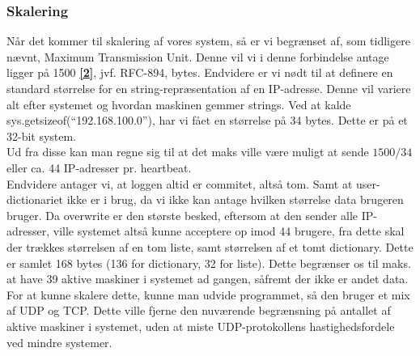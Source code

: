 \documentclass[a4paper,12pt]{article}
\begin{document}
\subsubsection{Skalering}
Når det kommer til skalering af vores system, så er vi begrænset af, som tidligere nævnt, Maximum Transmission Unit. Denne vil vi i denne forbindelse antage ligger på 1500 \hyperref[to]{\textbf{[2]}}, jvf. RFC-894, bytes. Endvidere er vi nødt til at definere en standard størrelse for en string-repræsentation af en IP-adresse. Denne vil variere alt efter systemet og hvordan maskinen gemmer strings. Ved at kalde sys.getsizeof(“192.168.100.0”), har vi fået en størrelse på 34 bytes. Dette er på et 32-bit system.
\\[5px]
Ud fra disse kan man regne sig til at det maks ville være muligt at sende $1500 / 34$ eller ca. 44 IP-adresser pr. heartbeat. 
\\ 
Endvidere antager vi, at loggen altid er commitet, altså tom. Samt at user-dictionariet ikke er i brug, da vi ikke kan antage hvilken størrelse data brugeren bruger.
Da overwrite er den største besked, eftersom at den sender alle IP-adresser, ville systemet altså kunne acceptere op imod 44 brugere, fra dette skal der trækkes størrelsen af en tom liste, samt størrelsen af et tomt dictionary. Dette er samlet 168 bytes (136 for dictionary, 32 for liste). 
Dette begrænser os til maks. at have 39 aktive maskiner i systemet ad gangen, såfremt der ikke er andet data.
\\
For at kunne skalere dette, kunne man udvide programmet, så den bruger et mix af UDP og TCP. Dette ville fjerne den nuværende begrænsning på antallet af aktive maskiner i systemet, uden at miste UDP-protokollens hastighedsfordele ved mindre systemer.
\newpage
\end{document}

